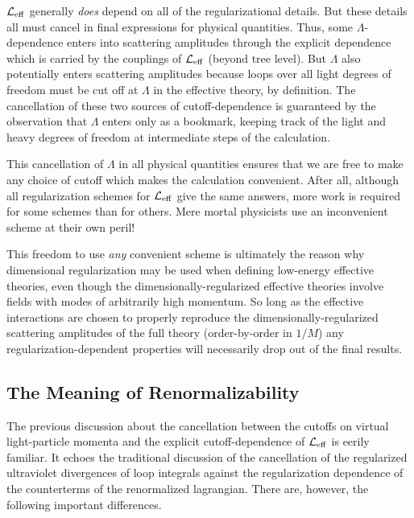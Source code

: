 \documentclass[12pt]{article}
\begin{document}
${\cal L}_{\rm eff}$ generally {\sl does} 
depend on all of the regularizational details. But these
details all must cancel in final expressions for physical
quantities. Thus, some $\Lambda$-dependence enters into
scattering amplitudes through the explicit dependence which 
is carried by the couplings of ${\cal L}_{\rm eff}$ (beyond
tree level). But $\Lambda$ also potentially enters scattering
amplitudes because loops over all light degrees of freedom
must be cut off at $\Lambda$ in the effective theory, by
definition. The cancellation of these two sources of
cutoff-dependence is guaranteed by the observation that
$\Lambda$ enters only as a bookmark, keeping
track of the light and heavy degrees of freedom at
intermediate steps of the calculation. 

This cancellation of $\Lambda$ in all physical quantities
ensures that we are free to make any choice of cutoff 
which makes the calculation convenient. After all, although
all regularization schemes for ${\cal L}_{\rm eff}$ give
the same answers, more work is required for 
some schemes than for others. Mere mortal physicists
use an inconvenient scheme at their own peril!

This freedom to use {\sl any} convenient
scheme is ultimately the reason why dimensional regularization 
may be used when defining low-energy effective theories,
even though the dimensionally-regularized effective
theories involve fields with modes of arbitrarily high
momentum. So long as the effective interactions are
chosen to properly reproduce the dimensionally-regularized 
scattering amplitudes of the full theory (order-by-order
in $1/M$) any regularization-dependent properties will
necessarily drop out of the final results. 

\subsection{The Meaning of Renormalizability}

The previous discussion about the cancellation between
the cutoffs on virtual light-particle momenta and
the explicit cutoff-dependence of ${\cal L}_{\rm eff}$
is eerily familiar. It echoes the traditional discussion
of the cancellation of the regularized ultraviolet divergences of
loop integrals against the regularization dependence of
the counterterms of the renormalized lagrangian. There
are, however, the following important differences.
\end{document}

